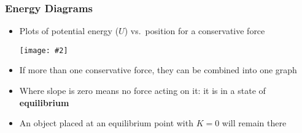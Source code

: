 \documentclass[12pt,compress,aspectratio=169]{beamer}
\newcommand{\pic}[2]{\texttt{[image: \#2]}}
\begin{document}
\begin{frame}
  \frametitle{Energy Diagrams}
  \begin{itemize}
  \item Plots of potential energy ($U$) vs.\ position for a conservative force
    \begin{center}
      \pic{.5}{energy-diagram.png}
    \end{center}
  \item If more than one conservative force, they can be combined into one graph
  \item Where slope is zero means no force acting on it: it is in a state of
    \textbf{equilibrium}
  \item An object placed at an equilibrium point with $K=0$ will remain there
  \end{itemize}
\end{frame}
\end{document}
